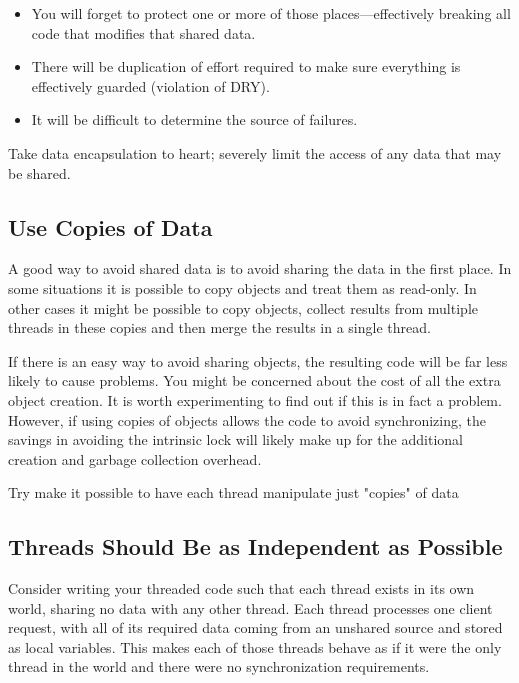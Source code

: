 \begin{itemize}
    \item You will forget to protect one or more of those places—effectively breaking all code that modifies that shared data.
    \item There will be duplication of effort required to make sure everything is effectively guarded (violation of DRY).
    \item It will be difficult to determine the source of failures.
\end{itemize}

\begin{marker}
Take data encapsulation to heart; severely limit the access of any data that may be shared.
\end{marker}

\subsection{Use Copies of Data}

A good way to avoid shared data is to avoid sharing the data in the first place. In some situations it is possible to copy objects and treat them as read-only. In other cases it might be possible to copy objects, collect results from multiple threads in these copies and then merge the results in a single thread.

If there is an easy way to avoid sharing objects, the resulting code will be far less likely to cause problems. You might be concerned about the cost of all the extra object creation. It is worth experimenting to find out if this is in fact a problem. However, if using copies of objects allows the code to avoid synchronizing, the savings in avoiding the intrinsic lock will likely make up for the additional creation and garbage collection overhead.

\begin{marker}
Try make it possible to have each thread manipulate just "copies" of data
\end{marker}

\subsection{Threads Should Be as Independent as Possible}

Consider writing your threaded code such that each thread exists in its own world, sharing no data with any other thread. Each thread processes one client request, with all of its required data coming from an unshared source and stored as local variables. This makes each of those threads behave as if it were the only thread in the world and there were no synchronization requirements.

